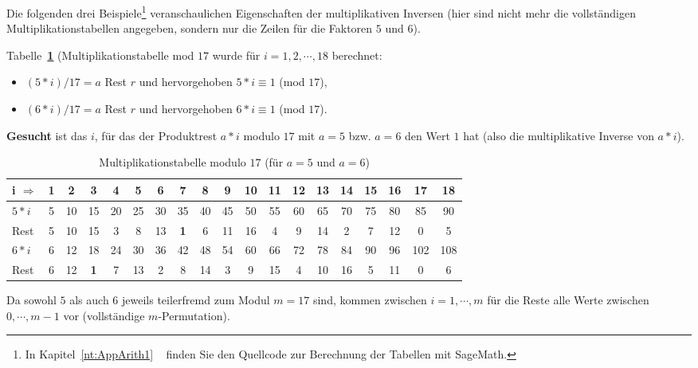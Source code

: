 \begin{refsegment}
Die folgenden drei Beispiele\footnote{%
  In Kapitel~\ref{nt:AppArith1} \glqq {}\grqq~
  finden Sie den Quellcode zur Berechnung der Tabellen mit SageMath.
}
veranschaulichen Eigenschaften der multiplikativen Inversen (hier sind nicht
mehr die vollständigen Multiplikationstabellen angegeben, sondern nur die Zeilen
für die Faktoren $5$ und $6$).

Tabelle~\textbf{\ref{mulmod17}} (Multiplikationstabelle mod $17$ wurde
für $i = 1, 2, \cdots, 18$ berechnet:
\begin{itemize}
   \item[] $(5*i)/17 = a$ Rest $r$ und hervorgehoben $5*i \equiv 1$ (mod $17$),
   \item[] $(6*i)/17 = a$ Rest $r$ und hervorgehoben $6*i \equiv 1$ (mod $17$).
\end{itemize}

\textbf{Gesucht} ist das $i$, für das der Produktrest $a*i$ modulo $17$ mit $a=5$
bzw. $a=6$ den Wert $1$ hat (also die multiplikative Inverse von $a*i$).

\begin{table}[ht]
\begin{center}
\begin{tabular}{|l@{\:}||c|c|c|c|c|c|c|c|c|c|c|c|c|c|c|c||c|c|}
\hline
i $\Rightarrow$     & 1  & 2  & 3  & 4  & 5  & 6  & 7  & 8  & 9 & 10 & 11 & 12 & 13 & 14 & 15 & 16  & 17 & 18\\
\hline
\hline
$5*i$               & 5 & 10 & 15 & 20 & 25 & 30 & 35 & 40 & 45 & 50 & 55 & 60 & 65 & 70 & 75 & 80  & 85 & 90\\
Rest                & 5 & 10 & 15  & 3  & 8 & 13  & \textbf{1}  & 6 & 11 & 16  & 4  & 9 & 14  & 2  & 7 & 12   & 0  & 5\\
\hline
$6*i$               & 6 & 12 & 18 & 24 & 30 & 36 & 42 & 48 & 54 & 60 & 66 & 72 & 78 & 84 & 90 & 96 & 102 & 108\\
Rest                & 6 & 12  & \textbf{1}  & 7 & 13  & 2  & 8 & 14  & 3  & 9 & 15  & 4 & 10 & 16  & 5 & 11   & 0  & 6\\
\hline
\end{tabular}
\end{center}
\caption{Multiplikationstabelle modulo $17$ (für $a=5$ und $a=6$)}
\label{SrcArith1a} \label{mulmod17}
\end{table}

Da sowohl $5$ als auch $6$ jeweils teilerfremd  zum Modul
$m=17$ sind, kommen zwischen $i=1, \cdots, m$ für die Reste alle Werte zwischen
$0, \cdots, m-1$ vor (vollständige $m$-Permutation).


\end{refsegment}
